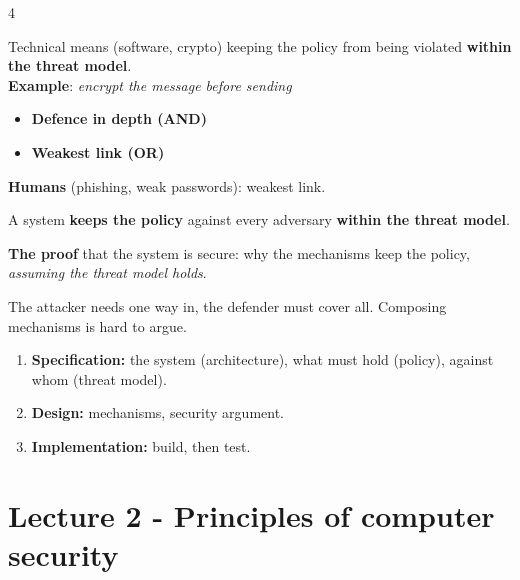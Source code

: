 \documentclass[8pt,a4paper,landscape]{extarticle}
\begin{document}
\begin{multicols*}{4}
\begin{thm}[title=Security mechanism]
    Technical means (software, crypto) keeping the policy from being violated \textbf{within the threat model}.\\
    \textbf{Example}: \textit{encrypt the message before sending}
\end{thm}

\begin{prop}[title=Composing mechanisms]
    \begin{itemize}
        \item \textbf{Defence in depth (AND)}
        \item \textbf{Weakest link (OR)}
    \end{itemize}
    \textbf{Humans} (phishing, weak passwords): weakest link.
\end{prop}

\begin{defn}[title=Secure]
    A system \textbf{keeps the policy} against every adversary \textbf{within the threat model}.
\end{defn}

\begin{thm}[title=Security argument]
    \textbf{The proof} that the system is secure: why the mechanisms keep the policy, \textit{assuming the threat model holds}.
\end{thm}

\begin{warn}[title=Attacker vs.\ defender]
    The attacker needs one way in, the defender must cover all. Composing mechanisms is hard to argue.
\end{warn}

\begin{prop}[title=Security engineering process]
    \begin{enumerate}
        \item \textbf{Specification:} the system (architecture), what must hold (policy), against whom (threat model).
        \item \textbf{Design:} mechanisms, security argument.
        \item \textbf{Implementation:} build, then test.
    \end{enumerate}
\end{prop}

\section{Lecture 2 - Principles of computer security}


\end{multicols*}
\end{document}
